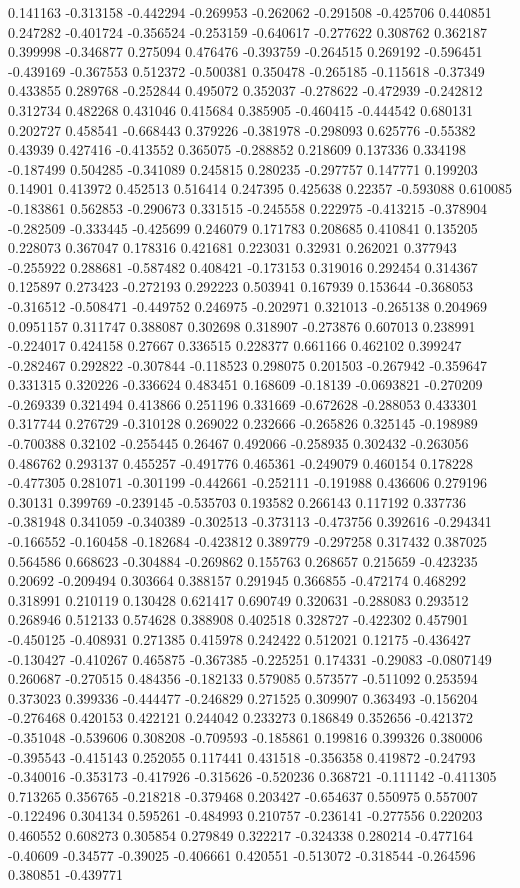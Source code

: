 0.141163 -0.313158 -0.442294 -0.269953 -0.262062 -0.291508 -0.425706 0.440851 0.247282 -0.401724 -0.356524 -0.253159 -0.640617 -0.277622 0.308762 0.362187 0.399998 -0.346877 0.275094 0.476476 -0.393759 -0.264515 0.269192 -0.596451 -0.439169 -0.367553 0.512372 -0.500381 0.350478 -0.265185 -0.115618 -0.37349 0.433855 0.289768 -0.252844 0.495072 0.352037 -0.278622 -0.472939 -0.242812 0.312734 0.482268 0.431046 0.415684 0.385905 -0.460415 -0.444542 0.680131 0.202727 0.458541 -0.668443 0.379226 -0.381978 -0.298093 0.625776 -0.55382 0.43939 0.427416 -0.413552 0.365075 -0.288852 0.218609 0.137336 0.334198 -0.187499 0.504285 -0.341089 0.245815 0.280235 -0.297757 0.147771 0.199203 0.14901 0.413972 0.452513 0.516414 0.247395 0.425638 0.22357 -0.593088 0.610085 -0.183861 0.562853 -0.290673 0.331515 -0.245558 0.222975 -0.413215 -0.378904 -0.282509 -0.333445 -0.425699 0.246079 0.171783 0.208685 0.410841 0.135205 0.228073 0.367047 0.178316 0.421681 0.223031 0.32931 0.262021 0.377943 -0.255922 0.288681 -0.587482 0.408421 -0.173153 0.319016 0.292454 0.314367 0.125897 0.273423 -0.272193 0.292223 0.503941 0.167939 0.153644 -0.368053 -0.316512 -0.508471 -0.449752 0.246975 -0.202971 0.321013 -0.265138 0.204969 0.0951157 0.311747 0.388087 0.302698 0.318907 -0.273876 0.607013 0.238991 -0.224017 0.424158 0.27667 0.336515 0.228377 0.661166 0.462102 0.399247 -0.282467 0.292822 -0.307844 -0.118523 0.298075 0.201503 -0.267942 -0.359647 0.331315 0.320226 -0.336624 0.483451 0.168609 -0.18139 -0.0693821 -0.270209 -0.269339 0.321494 0.413866 0.251196 0.331669 -0.672628 -0.288053 0.433301 0.317744 0.276729 -0.310128 0.269022 0.232666 -0.265826 0.325145 -0.198989 -0.700388 0.32102 -0.255445 0.26467 0.492066 -0.258935 0.302432 -0.263056 0.486762 0.293137 0.455257 -0.491776 0.465361 -0.249079 0.460154 0.178228 -0.477305 0.281071 -0.301199 -0.442661 -0.252111 -0.191988 0.436606 0.279196 0.30131 0.399769 -0.239145 -0.535703 0.193582 0.266143 0.117192 0.337736 -0.381948 0.341059 -0.340389 -0.302513 -0.373113 -0.473756 0.392616 -0.294341 -0.166552 -0.160458 -0.182684 -0.423812 0.389779 -0.297258 0.317432 0.387025 0.564586 0.668623 -0.304884 -0.269862 0.155763 0.268657 0.215659 -0.423235 0.20692 -0.209494 0.303664 0.388157 0.291945 0.366855 -0.472174 0.468292 0.318991 0.210119 0.130428 0.621417 0.690749 0.320631 -0.288083 0.293512 0.268946 0.512133 0.574628 0.388908 0.402518 0.328727 -0.422302 0.457901 -0.450125 -0.408931 0.271385 0.415978 0.242422 0.512021 0.12175 -0.436427 -0.130427 -0.410267 0.465875 -0.367385 -0.225251 0.174331 -0.29083 -0.0807149 0.260687 -0.270515 0.484356 -0.182133 0.579085 0.573577 -0.511092 0.253594 0.373023 0.399336 -0.444477 -0.246829 0.271525 0.309907 0.363493 -0.156204 -0.276468 0.420153 0.422121 0.244042 0.233273 0.186849 0.352656 -0.421372 -0.351048 -0.539606 0.308208 -0.709593 -0.185861 0.199816 0.399326 0.380006 -0.395543 -0.415143 0.252055 0.117441 0.431518 -0.356358 0.419872 -0.24793 -0.340016 -0.353173 -0.417926 -0.315626 -0.520236 0.368721 -0.111142 -0.411305 0.713265 0.356765 -0.218218 -0.379468 0.203427 -0.654637 0.550975 0.557007 -0.122496 0.304134 0.595261 -0.484993 0.210757 -0.236141 -0.277556 0.220203 0.460552 0.608273 0.305854 0.279849 0.322217 -0.324338 0.280214 -0.477164 -0.40609 -0.34577 -0.39025 -0.406661 0.420551 -0.513072 -0.318544 -0.264596 0.380851 -0.439771 